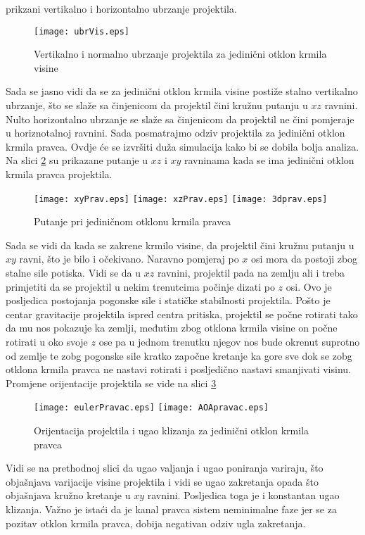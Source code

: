 prikzani vertikalno i horizontalno ubrzanje projektila.
\begin{figure}[!ht]
    \centering 
    \texttt{[image: ubrVis.eps]}
    \caption{Vertikalno i normalno ubrzanje projektila za jedinični otklon krmila visine}
    \label{fig:ubrVis}
\end{figure}
Sada se jasno vidi da se za jedinični otklon krmila visine postiže stalno vertikalno ubrzanje, što se slaže sa 
činjenicom da projektil čini kružnu putanju u $xz$ ravnini. Nulto horizontalno ubrzanje 
se slaže sa činjenicom da projektil ne čini pomjeraje u horiznotalnoj ravnini. 
Sada posmatrajmo odziv projektila za jedinični otklon krmila pravca. Ovdje će se izvršiti 
duža simulacija kako bi se dobila bolja analiza. Na slici \ref{fig:putanjePrav} su prikazane 
putanje u $xz$ i $xy$ ravninama kada se ima jedinični otklon krmila pravca projektila. 
\begin{figure}[!ht]
    \centering
    \texttt{[image: xyPrav.eps]}
    \texttt{[image: xzPrav.eps]}
    \texttt{[image: 3dprav.eps]}
    \caption{Putanje pri jediničnom otklonu krmila pravca}
    \label{fig:putanjePrav}
\end{figure}
Sada se vidi da kada se zakrene krmilo visine, da projektil čini kružnu putanju u $xy$ ravni, što je bilo 
i očekivano. Naravno pomjeraj po $x$ osi mora da postoji zbog stalne sile potiska. Vidi se da u 
$xz$ ravnini, projektil pada na zemlju ali i treba primjetiti da se projektil u nekim 
trenutcima počinje dizati po $z$ osi. Ovo je posljedica postojanja pogonske sile i statičke stabilnosti projektila. 
Pošto je centar gravitacije projektila ispred centra pritiska, projektil se počne rotirati tako da mu nos 
pokazuje ka zemlji, međutim zbog otklona krmila visine on počne rotirati u oko svoje $z$ ose pa u jednom trenutku 
njegov nos bude okrenut suprotno od zemlje te zobg pogonske sile kratko započne kretanje ka gore sve dok se 
zobg otklona krmila pravca ne nastavi rotirati i posljedično nastavi smanjivati visinu. 
Promjene orijentacije projektila se vide na slici \ref{fig:eulerPravac}
\begin{figure}[!ht]
    \centering
    \texttt{[image: eulerPravac.eps]}
    \texttt{[image: AOApravac.eps]}
    \caption{Orijentacija projektila i ugao klizanja za jedinični otklon krmila pravca}
    \label{fig:eulerPravac}
\end{figure}
Vidi se na prethodnoj slici da ugao valjanja i ugao poniranja variraju, što objašnjava 
varijacije visine projektila i vidi se ugao zakretanja opada što objašnjava kružno kretanje 
u $xy$ ravnini. Posljedica toga je i konstantan ugao klizanja. Važno je istaći da je kanal pravca 
sistem neminimalne faze jer se za pozitav otklon krmila pravca, dobija negativan odziv ugla zakretanja. 



